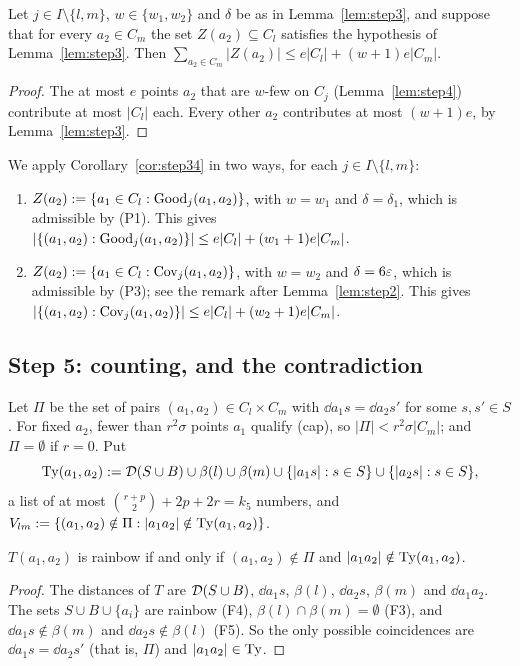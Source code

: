\begin{corollary}\label{cor:step34}
Let $j\in I\setminus\{l,m\}$, $w\in\{w_1,w_2\}$ and $\delta$ be as in Lemma~\ref{lem:step3}, and suppose that for every
$a_2\in C_m$ the set $Z(a_2)\subseteq C_l$ satisfies the hypothesis of Lemma~\ref{lem:step3}. Then
$\sum_{a_2\in C_m}|Z(a_2)|\le e|C_l|+(w+1)e|C_m|$.
\end{corollary}
\begin{proof}
The at most $e$ points $a_2$ that are $w$-few on $C_j$ (Lemma~\ref{lem:step4}) contribute at most $|C_l|$ each. Every other
$a_2$ contributes at most $(w+1)e$, by Lemma~\ref{lem:step3}.
\end{proof}

We apply Corollary~\ref{cor:step34} in two ways, for each $j\in I\setminus\{l,m\}$:
\begin{enumerate}[label=(\alph*)]
\item $Z(a_2):=\{a_1\in C_l:\mathrm{Good}_j(a_1,a_2)\}$, with $w=w_1$ and $\delta=\delta_1$, which is admissible by (P1). This gives
  $|\{(a_1,a_2):\mathrm{Good}_j(a_1,a_2)\}|\le e|C_l|+(w_1+1)e|C_m|$.
\item $Z(a_2):=\{a_1\in C_l:\mathrm{Cov}_j(a_1,a_2)\}$, with $w=w_2$ and $\delta=6\varepsilon$, which is admissible by (P3); see the
  remark after Lemma~\ref{lem:step2}. This gives $|\{(a_1,a_2):\mathrm{Cov}_j(a_1,a_2)\}|\le e|C_l|+(w_2+1)e|C_m|$.
\end{enumerate}

\subsection{Step 5: counting, and the contradiction}
Let $\Pi$ be the set of pairs $(a_1,a_2)\in C_l\times C_m$ with $\dd{a_1}s=\dd{a_2}{s'}$ for some $s,s'\in S$. For fixed $a_2$,
fewer than $r^2\sigma$ points $a_1$ qualify (cap), so $|\Pi|<r^2\sigma|C_m|$; and $\Pi=\emptyset$ if $r=0$. Put
\[
\mathrm{Ty}(a_1,a_2):=\mathcal{D}(S\cup B)\cup\beta(l)\cup\beta(m)\cup\{|a_1s|:s\in S\}\cup\{|a_2s|:s\in S\},
\]
a list of at most $\binom{r+p}2+2p+2r=k_5$ numbers, and $V_{lm}:=\{(a_1,a_2)\notin\Pi:|a_1a_2|\notin\mathrm{Ty}(a_1,a_2)\}$.

\begin{lemma}\label{lem:51}
$T(a_1,a_2)$ is rainbow if and only if $(a_1,a_2)\notin\Pi$ and $|a_1a_2|\notin\mathrm{Ty}(a_1,a_2)$.
\end{lemma}
\begin{proof}
The distances of $T$ are $\mathcal{D}(S\cup B)$, $\dd{a_1}s$, $\beta(l)$, $\dd{a_2}s$, $\beta(m)$ and $\dd{a_1}{a_2}$. The sets
$S\cup B\cup\{a_i\}$ are rainbow (F4), $\beta(l)\cap\beta(m)=\emptyset$ (F3), and $\dd{a_1}s\notin\beta(m)$ and
$\dd{a_2}s\notin\beta(l)$ (F5). So the only possible coincidences are $\dd{a_1}s=\dd{a_2}{s'}$ (that is, $\Pi$) and
$|a_1a_2|\in\mathrm{Ty}$.
\end{proof}

